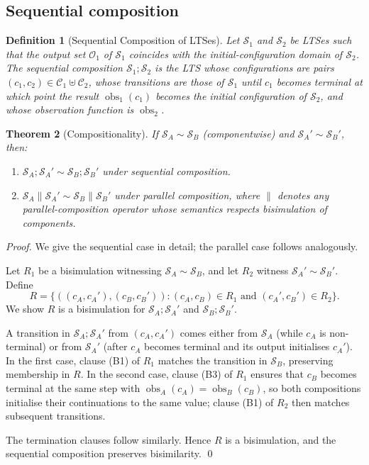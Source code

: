 \documentclass[twocolumn,11pt,a4paper]{article}
\newtheorem{theorem}{Theorem}[section]
\newtheorem{definition}[theorem]{Definition}
\DeclareMathOperator{\obs}{obs}
\newcommand{\Conf}{\mathcal{C}}
\newcommand{\Out}{\mathcal{O}}
\newcommand{\Sys}{\mathcal{S}}
\newcommand{\bisim}{\sim}
\begin{document}
\subsection{Sequential composition}

\begin{definition}[Sequential Composition of LTSes]
\label{def:seq}
Let $\Sys_1$ and $\Sys_2$ be LTSes such that the output set $\Out_1$ of $\Sys_1$ coincides with the initial-configuration domain of $\Sys_2$. The \emph{sequential composition} $\Sys_1; \Sys_2$ is the LTS whose configurations are pairs $(c_1, c_2) \in \Conf_1 \uplus \Conf_2$, whose transitions are those of $\Sys_1$ until $c_1$ becomes terminal at which point the result $\obs_1(c_1)$ becomes the initial configuration of $\Sys_2$, and whose observation function is $\obs_2$.
\end{definition}

\begin{theorem}[Compositionality]
\label{thm:compose}
If $\Sys_A \bisim \Sys_B$ (componentwise) and $\Sys_A' \bisim \Sys_B'$, then:
\begin{enumerate}[nosep,leftmargin=*]
\item $\Sys_A; \Sys_A' \bisim \Sys_B; \Sys_B'$ under sequential composition.
\item $\Sys_A \| \Sys_A' \bisim \Sys_B \| \Sys_B'$ under parallel composition, where $\|$ denotes any parallel-composition operator whose semantics respects bisimulation of components.
\end{enumerate}
\end{theorem}

\begin{proof}
We give the sequential case in detail; the parallel case follows analogously.

Let $R_1$ be a bisimulation witnessing $\Sys_A \bisim \Sys_B$, and let $R_2$ witness $\Sys_A' \bisim \Sys_B'$. Define
\[
R = \{((c_A, c_A'), (c_B, c_B')) : (c_A, c_B) \in R_1 \text{ and } (c_A', c_B') \in R_2\}.
\]
We show $R$ is a bisimulation for $\Sys_A; \Sys_A'$ and $\Sys_B; \Sys_B'$.

A transition in $\Sys_A; \Sys_A'$ from $(c_A, c_A')$ comes either from $\Sys_A$ (while $c_A$ is non-terminal) or from $\Sys_A'$ (after $c_A$ becomes terminal and its output initialises $c_A'$). In the first case, clause (B1) of $R_1$ matches the transition in $\Sys_B$, preserving membership in $R$. In the second case, clause (B3) of $R_1$ ensures that $c_B$ becomes terminal at the same step with $\obs_A(c_A) = \obs_B(c_B)$, so both compositions initialise their continuations to the same value; clause (B1) of $R_2$ then matches subsequent transitions.

The termination clauses follow similarly. Hence $R$ is a bisimulation, and the sequential composition preserves bisimilarity. \qed
\end{proof}
\end{document}
